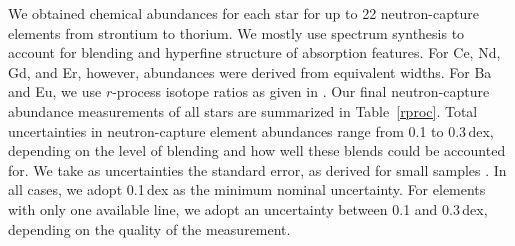\documentclass[twocolumn]{aastex63}
\begin{document}
We obtained chemical abundances for each star for up to 22 neutron-capture elements from strontium to thorium.
We mostly use spectrum synthesis to account for blending and hyperfine structure of absorption features. For Ce, Nd, Gd, and Er, however, abundances were derived from equivalent widths. For Ba and Eu, we use $r$-process isotope ratios as given in \citet{Sneden08}. Our final neutron-capture abundance measurements of all stars are summarized in Table~\ref{rproc}. Total uncertainties in neutron-capture element abundances range from 0.1 to 0.3\,dex, depending on the level of blending and how well these blends could be accounted for. We take as uncertainties the standard error, as derived for small samples \citep{Keeping62}. In all cases, we adopt 0.1\,dex as the minimum nominal uncertainty. For elements with only one available line, we adopt an uncertainty between 0.1 and 0.3\,dex, depending on the quality of the measurement.
\end{document}
